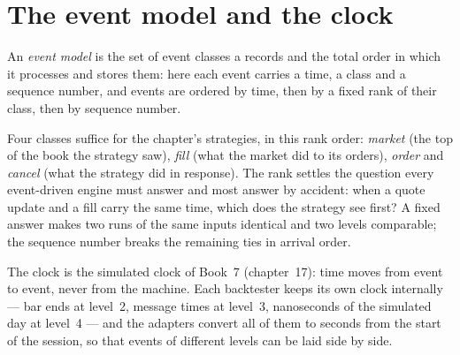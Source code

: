 \label{lst:pl:backtest-engine-architecture:quoter}

\label{lst:pl:backtest-engine-architecture:engine}

\section{The event model and the clock}

\begin{definition}\label{def:pl:backtest-engine-architecture:event}
An \emph{event model} is the set of event classes a  records and the total order in which it
processes and stores them: here each event carries a time, a class and a sequence number, and events are ordered by time, then by a
fixed rank of their class, then by sequence number.
\end{definition}

Four classes suffice for the chapter's strategies, in this rank order: \emph{market} (the top of the book the strategy saw), \emph{fill}
(what the market did to its orders), \emph{order} and \emph{cancel} (what the strategy did in response). The rank settles the question
every event-driven engine must answer and most answer by accident: when a quote update and a fill carry the same time, which does the
strategy see first? A fixed answer makes two runs of the same inputs identical and two levels comparable; the sequence number breaks
the remaining ties in arrival order.

\label{lst:pl:backtest-engine-architecture:events}

The clock is the simulated clock of Book~7 (chapter~17): time moves from event to event, never from the machine. Each backtester keeps
its own clock internally --- bar ends at level~2, message times at level~3, nanoseconds of the simulated day at level~4 --- and the
adapters convert all of them to seconds from the start of the session, so that events of different levels can be laid side by side.

